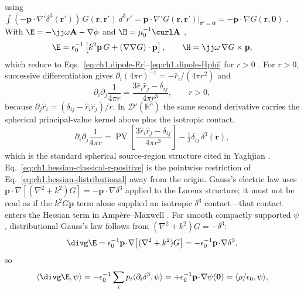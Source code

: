 using $\int (-\mathbf{p}\cdot\nabla'\delta^{3}(\mathbf{r}'))\,G(\mathbf{r},\mathbf{r}')\,d^3r'=\mathbf{p}\cdot\nabla' G(\mathbf{r},\mathbf{r}')|_{\mathbf{r}'=\mathbf{0}}=-\mathbf{p}\cdot\nabla G(\mathbf{r},\mathbf{0})$ \cite{jackson1999,stratton1941}. With $\E=-\jj\omega\mathbf{A}-\nabla\phi$ and $\H=\mu_0^{-1}\curl\mathbf{A}$ \cite{jackson1999,stratton1941},
\begin{equation}
\label{eq:ch1.dipole-E-dyadic-distributional}
\E=\epsilon_0^{-1}\left[k^{2}\mathbf{p}\,G+(\nabla\nabla G)\cdot\mathbf{p}\right],
\qquad
\H=\jj\omega\,\nabla G\times\mathbf{p},
\end{equation}
which reduce to Eqs.~\eqref{eq:ch1.dipole-Er}--\eqref{eq:ch1.dipole-Hphi} for $r>0$ \cite{stratton1941,harrington2001,yaghjian1982}. For $r>0$, successive differentiation gives $\partial_i(4\pi r)^{-1}=-\hat r_i/(4\pi r^2)$ and
\begin{equation}
\label{eq:ch1.hessian-classical-r-positive}
\partial_i\partial_j\frac{1}{4\pi r}
=\frac{3\hat r_i\hat r_j-\delta_{ij}}{4\pi r^{3}},
\qquad r>0,
\end{equation}
because $\partial_j\hat r_i=(\delta_{ij}-\hat r_i\hat r_j)/r$. In $\mathcal{D}'(\mathbb{R}^{3})$ the same second derivative carries the spherical principal-value kernel above plus the isotropic contact,
\begin{equation}
\label{eq:ch1.hessian-distributional}
\partial_i\partial_j\frac{1}{4\pi r}
=\operatorname{PV}\!\left[\frac{3\hat r_i\hat r_j-\delta_{ij}}{4\pi r^{3}}\right]
-\tfrac13\delta_{ij}\,\delta^{3}(\mathbf{r}),
\end{equation}
which is the standard spherical source-region structure cited in Yaghjian \cite{yaghjian1980dyadic,yaghjian1982}. Eq.~\eqref{eq:ch1.hessian-classical-r-positive} is the pointwise restriction of Eq.~\eqref{eq:ch1.hessian-distributional} away from the origin. Gauss's electric law uses $\mathbf{p}\cdot\nabla[(\nabla^2+k^2)G]=-\mathbf{p}\cdot\nabla\delta^{3}$ applied to the Lorenz structure; it must not be read as if the $k^{2}G\mathbf{p}$ term alone supplied an isotropic $\delta^{3}$ contact---that contact enters the Hessian term in Amp\`ere--Maxwell \cite{yaghjian1980dyadic,yaghjian1982}. For smooth compactly supported $\psi$, distributional Gauss's law follows from $(\nabla^2+k^2)G=-\delta^{3}$:
\[
\divg\E=\epsilon_0^{-1}\mathbf{p}\!\cdot\!\nabla\big[(\nabla^2+k^2)G\big]
=-\epsilon_0^{-1}\mathbf{p}\!\cdot\!\nabla\delta^{3},
\]
so
\[
\langle\divg\E,\psi\rangle
=-\epsilon_0^{-1}\sum_i p_i\langle\partial_i\delta^{3},\psi\rangle
=+\epsilon_0^{-1}\mathbf{p}\!\cdot\!\nabla\psi(\mathbf{0})
=\langle\rho/\epsilon_0,\psi\rangle,
\]
